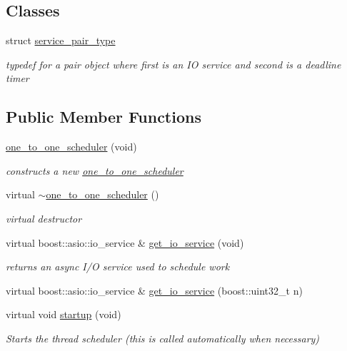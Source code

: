 \subsection*{Classes}
\begin{DoxyCompactItemize}
\item 
struct \hyperlink{structpion_1_1one__to__one__scheduler_1_1service__pair__type}{service\-\_\-pair\-\_\-type}
\begin{DoxyCompactList}\small\item\em typedef for a pair object where first is an I\-O service and second is a deadline timer \end{DoxyCompactList}\end{DoxyCompactItemize}
\subsection*{Public Member Functions}
\begin{DoxyCompactItemize}
\item 
\hyperlink{classpion_1_1one__to__one__scheduler_a1cf085d6cabbbe06891f316a3c0cb938}{one\-\_\-to\-\_\-one\-\_\-scheduler} (void)
\begin{DoxyCompactList}\small\item\em constructs a new \hyperlink{classpion_1_1one__to__one__scheduler}{one\-\_\-to\-\_\-one\-\_\-scheduler} \end{DoxyCompactList}\item 
virtual \hyperlink{classpion_1_1one__to__one__scheduler_a76da28c9f319dced91f30b1d303da518}{$\sim$one\-\_\-to\-\_\-one\-\_\-scheduler} ()
\begin{DoxyCompactList}\small\item\em virtual destructor \end{DoxyCompactList}\item 
virtual boost\-::asio\-::io\-\_\-service \& \hyperlink{classpion_1_1one__to__one__scheduler_a6ead3ddcbbcbfb0eba98b102530d2a90}{get\-\_\-io\-\_\-service} (void)
\begin{DoxyCompactList}\small\item\em returns an async I/\-O service used to schedule work \end{DoxyCompactList}\item 
virtual boost\-::asio\-::io\-\_\-service \& \hyperlink{classpion_1_1one__to__one__scheduler_a5af0e30b2ef08cbbaf40278c9066c166}{get\-\_\-io\-\_\-service} (boost\-::uint32\-\_\-t n)
\item 
virtual void \hyperlink{classpion_1_1one__to__one__scheduler_a8f32fd88bc0d95d9952c5045849e09b9}{startup} (void)
\begin{DoxyCompactList}\small\item\em Starts the thread scheduler (this is called automatically when necessary) \end{DoxyCompactList}\end{DoxyCompactItemize}
